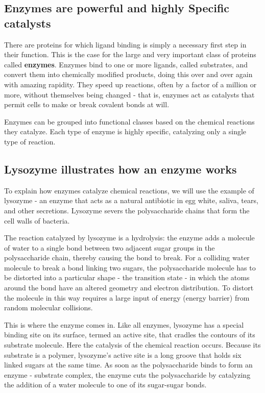 \subsection{Enzymes are powerful and highly Specific catalysts}

There are proteins for which ligand binding is simply a necessary first step
in their function. This is the case for the large and very important class
of proteins called \textbf{enzymes}. Enzymes bind to one or more ligands, called substrates,
and convert them into chemically modified products, doing this over and over again with amazing rapidity.
They speed up reactions, often by a factor of a
million or more, without themselves being changed - that is, enzymes act
as catalysts that permit cells to make or break covalent bonds at will.

Enzymes can be grouped into functional classes based on the chemical
reactions they catalyze. Each type of enzyme is highly specific,
catalyzing only a single type of reaction.

\subsection{Lysozyme illustrates how an enzyme works}

To explain how enzymes catalyze chemical reactions, we will use the
example of lysozyme - an enzyme that acts as a natural antibiotic in egg
white, saliva, tears, and other secretions. Lysozyme severs the polysaccharide
chains that form the cell walls of bacteria.

The reaction catalyzed by lysozyme is a hydrolysis: the enzyme adds a
molecule of water to a single bond between two adjacent sugar groups in
the polysaccharide chain, thereby causing the bond to break.
For a colliding water molecule to break a bond linking two sugars, the
polysaccharide molecule has to be distorted into a particular shape - the
transition state - in which the atoms around the bond have an altered
geometry and electron distribution. To distort the molecule in this way
requires a large input of energy (energy barrier) from random molecular collisions.

This is where the enzyme comes in. Like all enzymes, lysozyme has a
special binding site on its surface, termed an active site, that cradles the
contours of its substrate molecule. Here the catalysis of the chemical reaction
occurs. Because its substrate is a polymer, lysozyme’s active site is a
long groove that holds six linked sugars at the same time. As soon as the
polysaccharide binds to form an enzyme - substrate complex, the enzyme
cuts the polysaccharide by catalyzing the addition of a water molecule to
one of its sugar-sugar bonds.

